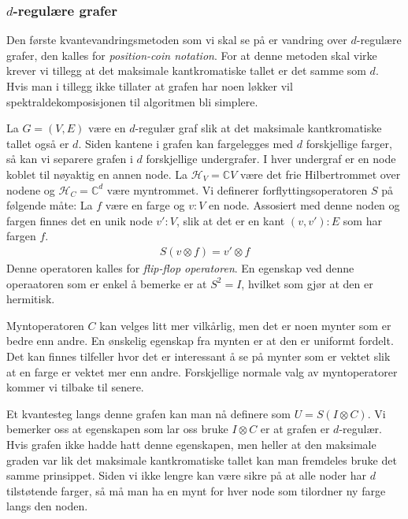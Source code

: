     \subsubsection{$d$-regulære grafer}

        Den første kvantevandringsmetoden som vi skal se på er vandring over $d$-regulære grafer, den kalles for \emph{position-coin notation}. For at denne metoden skal virke krever vi tillegg at det maksimale kantkromatiske tallet er det samme som $d$. Hvis man i tillegg ikke tillater at grafen har noen løkker vil spektraldekomposisjonen til algoritmen bli simplere.

        La $G=(V,E)$ være en $d$-regulær graf slik at det maksimale kantkromatiske tallet også er $d$. Siden kantene i grafen kan fargelegges med $d$ forskjellige farger, så kan vi separere grafen i $d$ forskjellige undergrafer. I hver undergraf er en node koblet til nøyaktig en annen node. La $\mathcal{H}_V = \mathbb{C}V$ være det frie Hilbertrommet over nodene og $\mathcal{H}_C = \mathbb{C}^d$ være myntrommet. Vi definerer forflyttingsoperatoren $S$ på følgende måte: La $f$ være en farge og $v:V$ en node. Assosiert med denne noden og fargen finnes det en unik node $v':V$, slik at det er en kant $(v,v'):E$ som har fargen $f$. 
        \begin{align*}
            S(v\otimes f)=v'\otimes f 
        \end{align*}
        Denne operatoren kalles for \emph{flip-flop operatoren}. En egenskap ved denne operaatoren som er enkel å bemerke er at $S^2 = I$, hvilket som gjør at den er hermitisk. 
        
        Myntoperatoren $C$ kan velges litt mer vilkårlig, men det er noen mynter som er bedre enn andre. En ønskelig egenskap fra mynten er at den er uniformt fordelt. Det kan finnes tilfeller hvor det er interessant å se på mynter som er vektet slik at en farge er vektet mer enn andre. Forskjellige normale valg av myntoperatorer kommer vi tilbake til senere.

        Et kvantesteg langs denne grafen kan man nå definere som $U=S(I\otimes C)$. Vi bemerker oss at egenskapen som lar oss bruke $I\otimes C$ er at grafen er $d$-regulær. Hvis grafen ikke hadde hatt denne egenskapen, men heller at den maksimale graden var lik det maksimale kantkromatiske tallet kan man fremdeles bruke det samme prinsippet. Siden vi ikke lengre kan være sikre på at alle noder har $d$ tilstøtende farger, så må man ha en mynt for hver node som tilordner ny farge langs den noden.


